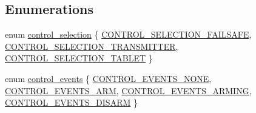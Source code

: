 \subsection*{Enumerations}
\begin{DoxyCompactItemize}
\item 
enum \hyperlink{group___control_ga61438f5375f5e08187c7e12f13723afd}{control\-\_\-selection} \{ \hyperlink{group___control_gga61438f5375f5e08187c7e12f13723afda1b46ea74ed4a00f9ae80dd8ecc29fc65}{C\-O\-N\-T\-R\-O\-L\-\_\-\-S\-E\-L\-E\-C\-T\-I\-O\-N\-\_\-\-F\-A\-I\-L\-S\-A\-F\-E}, 
\hyperlink{group___control_gga61438f5375f5e08187c7e12f13723afdab3795a3d043b1e09e3a3f9a9fb3dd141}{C\-O\-N\-T\-R\-O\-L\-\_\-\-S\-E\-L\-E\-C\-T\-I\-O\-N\-\_\-\-T\-R\-A\-N\-S\-M\-I\-T\-T\-E\-R}, 
\hyperlink{group___control_gga61438f5375f5e08187c7e12f13723afda671e301b166223e3f6a0cb2e0eb2d515}{C\-O\-N\-T\-R\-O\-L\-\_\-\-S\-E\-L\-E\-C\-T\-I\-O\-N\-\_\-\-T\-A\-B\-L\-E\-T}
 \}
\item 
enum \hyperlink{group___control_ga6db279174b366abaad3f5de70b10655c}{control\-\_\-events} \{ \hyperlink{group___control_gga6db279174b366abaad3f5de70b10655caa00112d5afc911295d9aa665483dbc02}{C\-O\-N\-T\-R\-O\-L\-\_\-\-E\-V\-E\-N\-T\-S\-\_\-\-N\-O\-N\-E}, 
\hyperlink{group___control_gga6db279174b366abaad3f5de70b10655caa1925993cc62becc38a19a51a2dc2712}{C\-O\-N\-T\-R\-O\-L\-\_\-\-E\-V\-E\-N\-T\-S\-\_\-\-A\-R\-M}, 
\hyperlink{group___control_gga6db279174b366abaad3f5de70b10655ca3ba849b595e592121378f1534b599c2a}{C\-O\-N\-T\-R\-O\-L\-\_\-\-E\-V\-E\-N\-T\-S\-\_\-\-A\-R\-M\-I\-N\-G}, 
\hyperlink{group___control_gga6db279174b366abaad3f5de70b10655caaf3578a8a437ec3e783c2b84abe3afe2}{C\-O\-N\-T\-R\-O\-L\-\_\-\-E\-V\-E\-N\-T\-S\-\_\-\-D\-I\-S\-A\-R\-M}
 \}
\end{DoxyCompactItemize}
